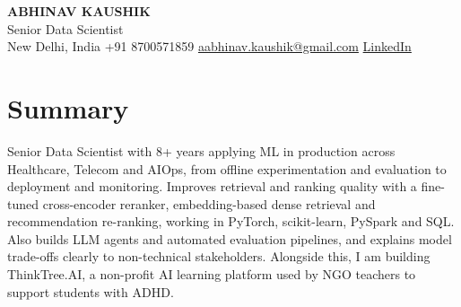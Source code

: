 \documentclass[10pt,a4paper]{article}
\begin{document}
\begin{center}
  {\LARGE\bfseries ABHINAV KAUSHIK}\\[2pt]
  {\large Senior Data Scientist}\\[2pt]
  New Delhi, India \textbar{} +91 8700571859 \textbar{} \href{mailto:aabhinav.kaushik@gmail.com}{aabhinav.kaushik@gmail.com} \textbar{} \href{https://www.linkedin.com/in/abhinav-kaushik10/}{LinkedIn}  
\end{center}

\section{Summary}
Senior Data Scientist with 8+ years applying ML in production across Healthcare, Telecom and AIOps, from offline experimentation and evaluation to deployment and monitoring. Improves retrieval and ranking quality with a fine-tuned cross-encoder reranker, embedding-based dense retrieval and recommendation re-ranking, working in PyTorch, scikit-learn, PySpark and SQL. Also builds LLM agents and automated evaluation pipelines, and explains model trade-offs clearly to non-technical stakeholders. Alongside this, I am building ThinkTree.AI, a non-profit AI learning platform used by NGO teachers to support students with ADHD.
\end{document}

